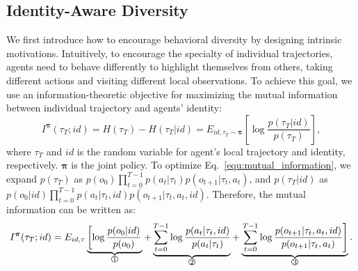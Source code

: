 \subsection{Identity-Aware Diversity}\label{sec:intrinsic}
We first introduce how to encourage behavioral diversity by designing intrinsic motivations. Intuitively, to encourage the specialty of individual trajectories, agents need to behave differently to highlight themselves from others, taking different actions and visiting different local observations. To achieve this goal, we use an information-theoretic objective for maximizing the mutual information between individual trajectory and agents' identity:
\begin{equation}
I^{\boldsymbol{\pi}}(\tau_T; id) = H(\tau_T) - H(\tau_T | id)
= E_{id, \tau_T \sim \boldsymbol{\pi}}\left[\log \frac{p(\tau_T | id)}{p(\tau_T)}\right],
\label{equ:mutual_information}
\end{equation}
where $\tau_T$ and $id$ is the random variable for agent's local trajectory and identity, respectively. $\boldsymbol{\pi}$ is the joint policy. To optimize Eq.~\ref{equ:mutual_information}, we expand $p(\tau_T)$ as $p(o_0) \prod_{t=0}^{T-1} p(a_t | \tau_t)p(o_{t+1} | \tau_t,a_t)$, and $p(\tau_T | id)$ as $p(o_0 | id) \prod_{t=0}^{T-1} p(a_t | \tau_t, id)p(o_{t+1} | \tau_t,a_t, id)$. Therefore, the mutual information can be written as:
\begin{equation}
I^{\boldsymbol{\pi}}(\tau_T; id) = E_{id,\tau}\underbrace{\left[\log \frac{p(o_0 | id)}{p(o_0)}\right.}_{\text{\raisebox{.5pt}{\textcircled{\raisebox{-.6pt}{1}}}}}+\underbrace{\sum_{t=0}^{T-1} \log \frac{p(a_t| \tau_t, id)}{p(a_t| \tau_t)}}_{\text{\raisebox{.5pt}{\textcircled{\raisebox{-.9pt}{2}}}}} + \underbrace{\left.\sum_{t=0}^{T-1} \log \frac{p(o_{t+1}| \tau_t,a_t,id)}{p(o_{t+1}| \tau_t,a_t)}\right]}_{\text{\raisebox{.5pt}{\textcircled{\raisebox{-.9pt}{3}}}}}.
\label{equ:per_timestep}
\end{equation}
